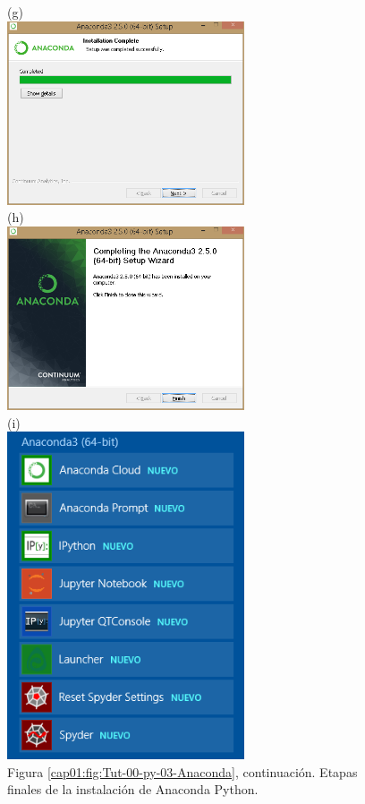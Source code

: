 \documentclass[10pt,a4paper]{article}\usepackage[]{graphicx}\usepackage[]{color}
\newcounter {cont01}
\begin{document}
\begin{figure}[p]
\begin{center}
(g)\\[1cm]
\includegraphics[width=7cm]{../fig/Tut-00-py-09-Anaconda.png}\\[1cm]
(h)\\[1cm]
\includegraphics[width=7cm]{../fig/Tut-00-py-10-Anaconda.png}\\[1cm]
(i)\\[1cm]
\includegraphics[width=7cm]{../fig/Tut-00-py-11-Anaconda.png}\\[1cm]
{Figura \ref{cap01:fig:Tut-00-py-03-Anaconda}, continuación. Etapas finales de la instalación de Anaconda Python.}
\end{center}
\end{figure}
\end{document}
